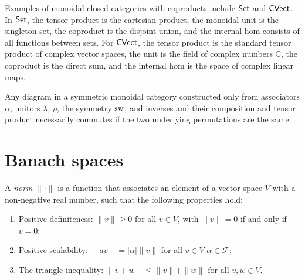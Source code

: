 \begin{example}
Examples of monoidal closed categories with coproducts include $\mathsf{Set}$ and $\mathsf{CVect}$. In $\mathsf{Set}$, the tensor product is the cartesian product, the monoidal unit is the singleton set, the coproduct is the disjoint union, and the internal hom consists of all functions between sets. For $\mathsf{CVect}$, the tensor product is the standard tensor product of complex vector spaces, the unit is the field of complex numbers $\mathbb{C}$, the coproduct is the direct sum, and the internal hom is the space of complex linear maps. %
\end{example}


\begin{theorem} \cite[Section 6.2]{yanofskyMonoidalCategoryTheory2024}
Any diagram in a symmetric monoidal category constructed only from associators $\alpha$, unitors $\lambda$, $\rho$, the symmetry $\mathrm{sw}$, and inverses and their composition and tensor product necessarily commutes if the two underlying permutations are the same.
\end{theorem}


\section{Banach spaces}





\begin{definition} \label{def:norm}
  A \emph{norm} $\|\cdot\|$ is a function that associates an element of a vector space $V$ with a non-negative real number, such that the following properties hold:
  \begin{enumerate}
    \item Positive definiteness: $\|v\| \geq 0$ for all $v \in V$, with $\|v\| = 0$ if and only if $v = 0$;
    \item Positive scalability: $\|av\| = |\alpha|\|v\|$ for all $v \in V$  $\alpha \in \mathcal{F}$;
    \item The triangle inequality: $\|v + w\| \leq \|v\| + \|w\|$ for all $v, w \in V$.
  \end{enumerate}
\end{definition}

